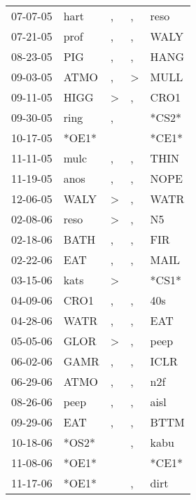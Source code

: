 \begin{supertabular}{lllll}
 07-07-05 &   hart &                , &                , &   reso \\
 07-21-05 &   prof &                , &                , &   WALY \\
 08-23-05 &    PIG &                , &                , &   HANG \\
 09-03-05 &   ATMO &                , &     \textgreater &   MULL \\
 09-11-05 &   HIGG &     \textgreater &                , &   CRO1 \\
 09-30-05 &   ring &                , &                  &  *CS2* \\
 10-17-05 &  *OE1* &                  &                  &  *CE1* \\
 11-11-05 &   mulc &                , &                , &   THIN \\
 11-19-05 &   anos &                , &                , &   NOPE \\
 12-06-05 &   WALY &     \textgreater &                , &   WATR \\
 02-08-06 &   reso &     \textgreater &                , &     N5 \\
 02-18-06 &   BATH &                , &                , &    FIR \\
 02-22-06 &    EAT &                , &                , &   MAIL \\
 03-15-06 &   kats &     \textgreater &                  &  *CS1* \\
 04-09-06 &   CRO1 &                , &                , &    40s \\
 04-28-06 &   WATR &                , &                , &    EAT \\
 05-05-06 &   GLOR &     \textgreater &                , &   peep \\
 06-02-06 &   GAMR &                , &                , &   ICLR \\
 06-29-06 &   ATMO &                , &                , &    n2f \\
 08-26-06 &   peep &                , &                , &   aisl \\
 09-29-06 &    EAT &                , &                , &   BTTM \\
 10-18-06 &  *OS2* &                  &                , &   kabu \\
 11-08-06 &  *OE1* &                  &                  &  *CE1* \\
 11-17-06 &  *OE1* &                  &                , &   dirt \\

\end{supertabular}
